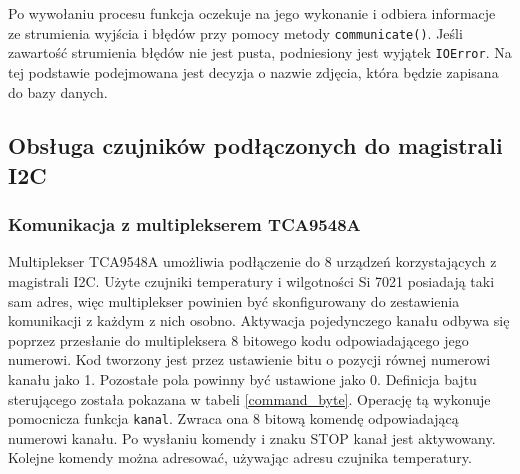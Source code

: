 \documentclass[a4paper,12pt,twoside]{article}
\begin{document}
Po wywołaniu procesu funkcja oczekuje na jego wykonanie i odbiera informacje ze strumienia wyjścia i błędów przy pomocy metody \texttt{communicate()}. Jeśli zawartość strumienia błędów nie jest pusta, podniesiony jest wyjątek \texttt{IOError}. Na tej podstawie podejmowana jest decyzja o nazwie zdjęcia, która będzie zapisana do bazy danych. 
\subsection{Obsługa czujników podłączonych do magistrali I2C}
\subsubsection{Komunikacja z multiplekserem TCA9548A}
Multiplekser TCA9548A umożliwia podłączenie do 8 urządzeń korzystających z magistrali I2C. Użyte czujniki temperatury i wilgotności Si 7021 posiadają taki sam adres, więc multiplekser powinien być skonfigurowany do zestawienia komunikacji z każdym z nich osobno. Aktywacja pojedynczego kanału odbywa się poprzez przesłanie do multipleksera 8 bitowego kodu odpowiadającego jego numerowi. Kod tworzony jest przez ustawienie bitu o pozycji równej numerowi kanału jako 1. Pozostałe pola powinny być ustawione jako 0. Definicja bajtu sterującego została pokazana w tabeli \ref{command_byte}. Operację tą wykonuje pomocnicza funkcja \texttt{kanal}. Zwraca ona 8 bitową komendę odpowiadającą numerowi kanału. Po wysłaniu komendy i znaku STOP kanał jest aktywowany. Kolejne komendy można adresować, używając adresu czujnika temperatury.
\end{document}
